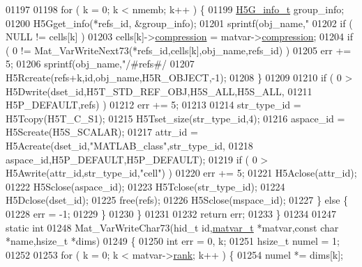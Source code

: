 \begin{DoxyCode}
01197 
01198             \textcolor{keywordflow}{for} ( k = 0; k < nmemb; k++ ) \{
01199                 \hyperlink{struct_h5_g__info__t}{H5G\_info\_t} group\_info;
01200                 H5Gget\_info(*refs\_id, &group\_info);
01201                 sprintf(obj\_name,\textcolor{stringliteral}{"%
01202                 \textcolor{keywordflow}{if} ( NULL != cells[k] )
01203                     cells[k]->\hyperlink{group___m_a_t_aeef0466048621cb2c959ba7f6c774d06}{compression} = matvar->\hyperlink{group___m_a_t_aeef0466048621cb2c959ba7f6c774d06}{compression};
01204                 \textcolor{keywordflow}{if} ( 0 != Mat\_VarWriteNext73(*refs\_id,cells[k],obj\_name,refs\_id) )
01205                     err += 5;
01206                 sprintf(obj\_name,\textcolor{stringliteral}{"/#refs#/%
01207                 H5Rcreate(refs+k,\textcolor{keywordtype}{id},obj\_name,H5R\_OBJECT,-1);
01208             \}
01209 
01210             \textcolor{keywordflow}{if} ( 0 > H5Dwrite(dset\_id,H5T\_STD\_REF\_OBJ,H5S\_ALL,H5S\_ALL,
01211                               H5P\_DEFAULT,refs) )
01212                 err += 5;
01213 
01214             str\_type\_id = H5Tcopy(H5T\_C\_S1);
01215             H5Tset\_size(str\_type\_id,4);
01216             aspace\_id = H5Screate(H5S\_SCALAR);
01217             attr\_id = H5Acreate(dset\_id,\textcolor{stringliteral}{"MATLAB\_class"},str\_type\_id,
01218                                 aspace\_id,H5P\_DEFAULT,H5P\_DEFAULT);
01219             \textcolor{keywordflow}{if} ( 0 > H5Awrite(attr\_id,str\_type\_id,\textcolor{stringliteral}{"cell"}) )
01220                 err += 5;
01221             H5Aclose(attr\_id);
01222             H5Sclose(aspace\_id);
01223             H5Tclose(str\_type\_id);
01224             H5Dclose(dset\_id);
01225             free(refs);
01226             H5Sclose(mspace\_id);
01227         \} \textcolor{keywordflow}{else} \{
01228             err = -1;
01229         \}
01230     \}
01231 
01232     \textcolor{keywordflow}{return} err;
01233 \}
01234 
01247 \textcolor{keyword}{static} \textcolor{keywordtype}{int}
01248 Mat\_VarWriteChar73(hid\_t \textcolor{keywordtype}{id},\hyperlink{group___m_a_t_structmatvar__t}{matvar\_t} *matvar,\textcolor{keyword}{const} \textcolor{keywordtype}{char} *name,hsize\_t *dims)
01249 \{
01250     \textcolor{keywordtype}{int}     err = 0, k;
01251     hsize\_t numel = 1;
01252 
01253     \textcolor{keywordflow}{for} ( k = 0; k < matvar->\hyperlink{group___m_a_t_a84ba70c96ded13cc555fa75b768d9921}{rank}; k++ ) \{
01254         numel *= dims[k];
}}
\end{DoxyCode}
